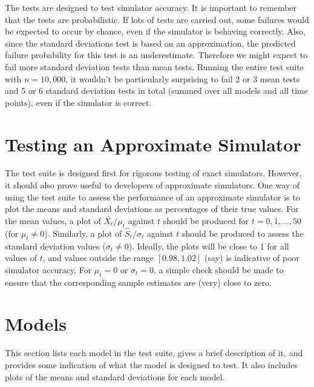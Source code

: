 \documentclass[12pt,a4paper]{article}
\begin{document}
The tests are designed to test simulator accuracy. It is important to
remember that the tests are probabilistic. If lots of tests are
carried out, some failures would be expected to occur by chance, even
if the simulator is behaving correctly. Also, since the standard
deviations test is based on an approximation, the predicted failure
probability for this test is an underestimate. Therefore we might
expect to fail more standard deviation tests than mean tests. Running
the entire test suite with $n=10,000$, it wouldn't be particularly
surprising to fail 2 or 3 mean tests and 5 or 6 standard deviation
tests in total (summed over all models and all time points), even if
the simulator is correct.

\section{Testing an Approximate Simulator}

The test suite is designed first for rigorous testing of exact
simulators. However, it should also prove useful to developers of
approximate simulators. One way of using the test suite to assess the
performance of an approximate simulator is to plot the means and
standard deviations as percentages of their true values. For the mean
values, a plot of $\bar{X_t}/\mu_t$ against $t$ should be produced for
$t=0,1,\ldots,50$ (for $\mu_t\not=0$). Similarly, a plot of
$\hat{S}_t/\sigma_t$ against $t$ should be produced to assess the
standard deviation values ($\sigma_t\not=0$). Ideally, the plots will
be close to 1 for all values of $t$, and values outside the range
$[0.98,1.02]$ (say) is indicative of poor simulator accuracy. For
$\mu_t=0$ or $\sigma_t=0$, a simple check should be made to ensure
that the corresponding sample estimates are (very) close to zero.

\section{Models}

This section lists each model in the test suite, gives a brief
description of it, and provides some indication of what the model is
designed to test. It also includes plots of the means and standard
deviations for each model.




\end{document}
